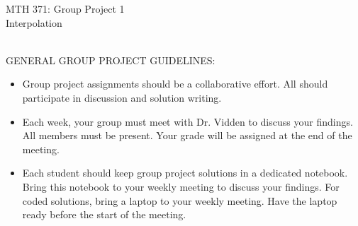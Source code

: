 \documentclass[addpoints, 11pt]{exam}
\begin{document}
\vspace{100mm}
\begin{center} \Large
MTH 371: Group Project 1 \\ Interpolation \normalsize
\end{center}
\ \\
\noindent GENERAL GROUP PROJECT GUIDELINES: 
\begin{itemize}
\item Group project assignments should be a collaborative effort. All should participate in discussion and solution writing. \vspace{-2mm}
\item Each week, your group must meet with Dr. Vidden to discuss your findings. All members must be present. Your grade will be assigned at the end of the meeting. \vspace{-2mm}
\item Each student should keep group project solutions in a dedicated notebook. Bring this notebook to your weekly meeting to discuss your findings. For coded solutions, bring a laptop to your weekly meeting. Have the laptop ready before the start of the meeting. \vspace{-2mm}
\end{itemize}
\ \\
\end{document}
